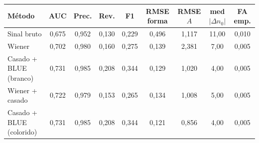 \begin{tabular}{lcccccccc}
\toprule
Método & AUC & Prec. & Rev. & F1 & RMSE forma & RMSE $A$ & med$|\Delta n_0|$ & FA emp. \\
\midrule
Sinal bruto & 0{,}675 & 0{,}952 & 0{,}130 & 0{,}229 & 0{,}496 & 1{,}117 & 11{,}00 & 0{,}010 \\
Wiener & 0{,}702 & 0{,}980 & 0{,}160 & 0{,}275 & 0{,}139 & 2{,}381 & 7{,}00 & 0{,}005 \\
Casado + BLUE (branco) & 0{,}731 & 0{,}985 & 0{,}208 & 0{,}344 & 0{,}129 & 1{,}020 & 4{,}00 & 0{,}005 \\
Wiener + casado & 0{,}722 & 0{,}979 & 0{,}153 & 0{,}265 & 0{,}134 & 1{,}008 & 5{,}00 & 0{,}005 \\
Casado + BLUE (colorido) & 0{,}731 & 0{,}985 & 0{,}208 & 0{,}344 & 0{,}121 & 0{,}856 & 4{,}00 & 0{,}005 \\
\bottomrule
\end{tabular}
